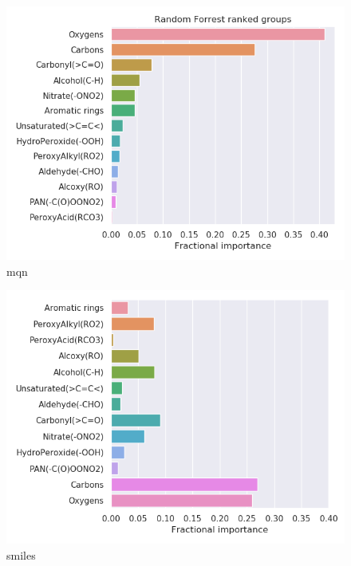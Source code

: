 \begin{subfigure}[b]{0.4\textwidth}
    \centering
    \includegraphics[width=\textwidth]{outputs/PCA/mqn/legend.png}
    \caption{mqn}
    \label{fig:legend_PCA_mqn}
\end{subfigure}
\begin{subfigure}[b]{0.4\textwidth}
    \centering
    \includegraphics[width=\textwidth]{outputs/PCA/smiles/legend.png}
    \caption{smiles}
    \label{fig:legend_PCA_smiles}
\end{subfigure}
